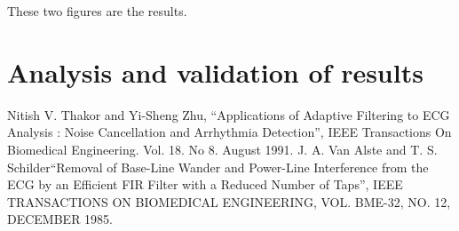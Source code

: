 \documentclass[conference]{IEEEtran}
\begin{document}
These two figures are the results.

\section{Analysis and validation of results}


\begin{thebibliography}{00}
 Nitish V. Thakor and Yi-Sheng Zhu, ``Applications of Adaptive Filtering to ECG Analysis :
Noise Cancellation and Arrhythmia Detection'', IEEE Transactions On Biomedical Engineering. Vol. 18. No 8. August 1991.
 J. A. Van Alste and T. S. Schilder``Removal of Base-Line Wander and Power-Line Interference from the ECG by an Efficient FIR Filter with a Reduced Number of Taps'', IEEE TRANSACTIONS ON BIOMEDICAL ENGINEERING, VOL. BME-32, NO. 12, DECEMBER 1985.
\end{thebibliography}
\end{document}
